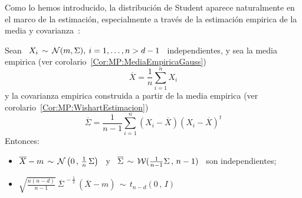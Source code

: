 Como lo hemos introducido, la  distribuci\'on de Student aparece naturalmente en
el  marco  de la  estimaci\'on,  especialmente  a  trav\'es de  la  estimaci\'on
empirica de la media y covarianza~\cite{Mui82, GupNag99, BilBre99, And03, Seb04}:
%
\begin{teorema}%
%
  Sean  \  $X_i \,  \sim  \,  \mathcal{N}(m,\Sigma), \:  i  =  1, \ldots  ,  n  > d-1$  \
  independientes,       y      sea       la       media      empirica       (ver
  corolario~\ref{Cor:MP:MediaEmpiricaGauss})
  \[
  \overline{X} = \frac{1}{n} \sum_{i=1}^n X_i
  \]
  y  la  covarianza empirica  construida  a partir  de  la  media empirica  (ver
  corolario~\ref{Cor:MP:WishartEstimacion})
  \[
  \overline{\Sigma}  =  \frac{1}{n-1}  \sum_{i=1}^n  \left( X_i  -  \overline{X}
  \right) \left( X_i - \overline{X} \right)^t
  \]
  Entonces:
  \begin{itemize}
  \item $\overline{X} -  m \, \sim \,  \mathcal{N}\left( 0 \, , \,  \frac{1}{n} \, \Sigma
    \right)$ \ y  \ $\overline{\Sigma} \, \sim \, \mathcal{W}(  \frac{1}{n-1} \Sigma \, ,
    \, n-1 ) $ \ son independientes;
  \item $\sqrt{\frac{n (n-d)}{n-1}} \: \overline{\Sigma}^{\, -\frac12} \, \left(
      \overline{X} - m \right) \, \sim \, t_{n-d}\left( 0 \, , \, I \right)$
  \end{itemize}
\end{teorema}
%
